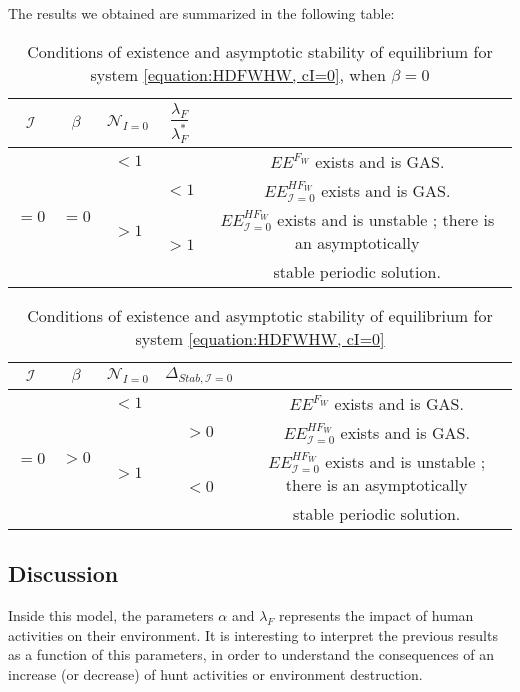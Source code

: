 \documentclass{article}
\newcommand{\lfw}{\lambda_{F}}
\newcommand{\lfw}{\lambda_{F}}
\newcommand{\cI}{\mathcal{I}}
\begin{document}
The results we obtained are summarized in the following table:
\begin{table}[!ht]
\centering
\def\arraystretch{2}
\begin{tabular}{c|c|c|c|c}
$\cI$ &$\beta$ & $\mathcal{N}_{I =0}$ &  $\dfrac{\lfw}{  \lfw ^*}$ & \\
\hline
\multirow{4}{*}{$=0$}&\multirow{4}{*}{$=0$} & $ < 1$ & &$EE^{F_W}$ exists and is GAS.  \\
\cline{3-5}
 & & \multirow{3}{*}{$> 1$} & $ <1$ &$EE^{HF_W}_{\cI=0}$ exists and is GAS.\\
 \cline{4-5}
 & & &\multirow{2}{*}{$ > 1$} & $EE^{HF_W}_{\cI=0}$ exists and is unstable ; there is an asymptotically \\
& & & &  stable periodic solution.
\end{tabular}
\caption{\centering Conditions of existence and asymptotic stability of equilibrium for system \eqref{equation:HDFWHW, cI=0}, when $\beta = 0$}
\end{table}


\begin{table}[!ht]
\centering
\def\arraystretch{2}
\begin{tabular}{c|c|c|c|c}
$\cI$ &$\beta$ & $\mathcal{N}_{I =0}$ &  $\Delta_{Stab, \cI =0}$ & \\
\hline
\multirow{4}{*}{$=0$}&\multirow{4}{*}{$>0$} & $ < 1$ & &$EE^{F_W}$ exists and is GAS.  \\
\cline{3-5}
 & & \multirow{3}{*}{$> 1$} & $ >0$ &$EE^{HF_W}_{\cI=0}$ exists and is GAS.\\
 \cline{4-5}
 & & &\multirow{2}{*}{$ <0 $} & $EE^{HF_W}_{\cI=0}$ exists and is unstable ; there is an asymptotically \\
& & & &  stable periodic solution.
\end{tabular}
\caption{\centering Conditions of existence and asymptotic stability of equilibrium for system \eqref{equation:HDFWHW, cI=0}}
\end{table}

\subsection{Discussion}
Inside this model, the parameters $\alpha$ and $\lfw$ represents the impact of human activities on their environment. It is interesting to interpret the previous results as a function of this parameters, in order to understand the consequences of an increase (or decrease) of hunt activities or environment destruction.
\end{document}
